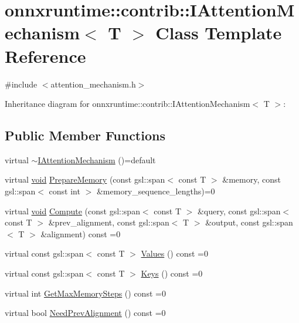 \hypertarget{classonnxruntime_1_1contrib_1_1IAttentionMechanism}{}\section{onnxruntime\+:\+:contrib\+:\+:I\+Attention\+Mechanism$<$ T $>$ Class Template Reference}
\label{classonnxruntime_1_1contrib_1_1IAttentionMechanism}


{\ttfamily \#include $<$attention\+\_\+mechanism.\+h$>$}



Inheritance diagram for onnxruntime\+:\+:contrib\+:\+:I\+Attention\+Mechanism$<$ T $>$\+:
\subsection*{Public Member Functions}
\begin{DoxyCompactItemize}
\item 
virtual \mbox{\hyperlink{classonnxruntime_1_1contrib_1_1IAttentionMechanism_a21a0bea988fa61f2ffeabd4894109685}{$\sim$\+I\+Attention\+Mechanism}} ()=default
\item 
virtual \mbox{\hyperlink{mlasi_8h_a88f941d423cb2a819b70a1358982b1a6}{void}} \mbox{\hyperlink{classonnxruntime_1_1contrib_1_1IAttentionMechanism_a9b56c5b71af342077b483c762fc2e724}{Prepare\+Memory}} (const gsl\+::span$<$ const T $>$ \&memory, const gsl\+::span$<$ const int $>$ \&memory\+\_\+sequence\+\_\+lengths)=0
\item 
virtual \mbox{\hyperlink{mlasi_8h_a88f941d423cb2a819b70a1358982b1a6}{void}} \mbox{\hyperlink{classonnxruntime_1_1contrib_1_1IAttentionMechanism_a06c96353dea91e2e81d22f34a96da713}{Compute}} (const gsl\+::span$<$ const T $>$ \&query, const gsl\+::span$<$ const T $>$ \&prev\+\_\+alignment, const gsl\+::span$<$ T $>$ \&output, const gsl\+::span$<$ T $>$ \&alignment) const =0
\item 
virtual const gsl\+::span$<$ const T $>$ \mbox{\hyperlink{classonnxruntime_1_1contrib_1_1IAttentionMechanism_a74f8db1c6302b52dfea595c230ce6a69}{Values}} () const =0
\item 
virtual const gsl\+::span$<$ const T $>$ \mbox{\hyperlink{classonnxruntime_1_1contrib_1_1IAttentionMechanism_a87c46bfbbc8debe139ed12e241393381}{Keys}} () const =0
\item 
virtual int \mbox{\hyperlink{classonnxruntime_1_1contrib_1_1IAttentionMechanism_ab39e568cfd98ecbc8403ae4291ff3ab2}{Get\+Max\+Memory\+Steps}} () const =0
\item 
virtual bool \mbox{\hyperlink{classonnxruntime_1_1contrib_1_1IAttentionMechanism_a4251e6c13e13e5bc1d56fcb9687799b2}{Need\+Prev\+Alignment}} () const =0
\end{DoxyCompactItemize}


